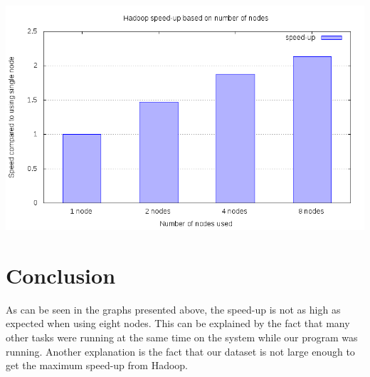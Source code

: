 \documentclass[a4paper,12px]{article}
\begin{document}
\begin{center}
    \includegraphics[width=\textwidth]{speedup}
\end{center}

\section{Conclusion}

As can be seen in the graphs presented above, the speed-up is not as high as
expected when using eight nodes. This can be explained by the fact that
many other tasks were running at the same time on the system while our program
was running. Another explanation is the fact that our dataset is not large
enough to get the maximum speed-up from Hadoop.



%
%
\end{document}

